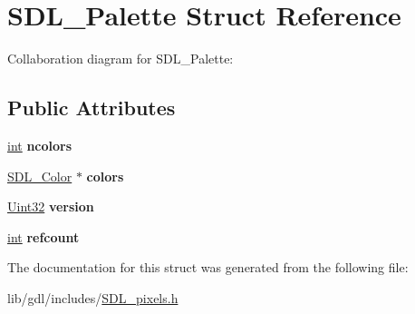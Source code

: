 \hypertarget{struct_s_d_l___palette}{}\section{S\+D\+L\+\_\+\+Palette Struct Reference}
\label{struct_s_d_l___palette}


Collaboration diagram for S\+D\+L\+\_\+\+Palette\+:
\subsection*{Public Attributes}
\begin{DoxyCompactItemize}
\item 
\hypertarget{struct_s_d_l___palette_a81a0cc3197480e994c6b06f1f0567091}{}\hyperlink{_s_d_l__thread_8h_a6a64f9be4433e4de6e2f2f548cf3c08e}{int} {\bfseries ncolors}\label{struct_s_d_l___palette_a81a0cc3197480e994c6b06f1f0567091}

\item 
\hypertarget{struct_s_d_l___palette_ad757a50037f43533196e94942440b241}{}\hyperlink{struct_s_d_l___color}{S\+D\+L\+\_\+\+Color} $\ast$ {\bfseries colors}\label{struct_s_d_l___palette_ad757a50037f43533196e94942440b241}

\item 
\hypertarget{struct_s_d_l___palette_a5b8d45519f6850a32f13f1602ce37a8e}{}\hyperlink{_s_d_l__stdinc_8h_add440eff171ea5f55cb00c4a9ab8672d}{Uint32} {\bfseries version}\label{struct_s_d_l___palette_a5b8d45519f6850a32f13f1602ce37a8e}

\item 
\hypertarget{struct_s_d_l___palette_a35c667737f883f973bb0a8dea143b08d}{}\hyperlink{_s_d_l__thread_8h_a6a64f9be4433e4de6e2f2f548cf3c08e}{int} {\bfseries refcount}\label{struct_s_d_l___palette_a35c667737f883f973bb0a8dea143b08d}

\end{DoxyCompactItemize}


The documentation for this struct was generated from the following file\+:\begin{DoxyCompactItemize}
\item 
lib/gdl/includes/\hyperlink{_s_d_l__pixels_8h}{S\+D\+L\+\_\+pixels.\+h}\end{DoxyCompactItemize}
